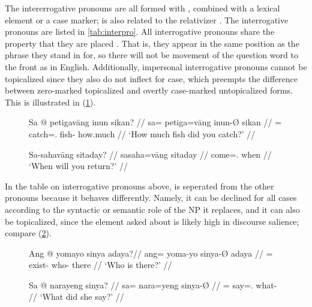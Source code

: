The intererrogative pronouns are all formed with , combined with
a lexical element or a case marker;  is also related to the
relativizer . The interrogative pronouns are listed in
\autoref{tab:interpro}. All interrogative pronouns share the property that they
are placed . That is, they appear in the same position as the
phrase they stand in for, so there will not be movement of the question word to
the front as in English. Additionally, impersonal interrogative pronouns cannot
be topicalized since they also do not inflect for case, which preempts the
difference between zero-marked topicalized and overtly case-marked
untopicalized forms. This is illustrated in (\ref{ex:qprondist}).

\begin{figure}[h]
\pex\label{ex:qprondist}
\a\begingl
	\gla Sa @ petigavāng inun sikan? //
	\glb sa= petiga=vāng inun-Ø sikan //
	\glc \PatT{}= catch=\Second{}.\Aarg{} fish-\Top{} how.much //
	\glft `How much fish did you catch?' //
\endgl

\a\begingl
	\gla Sa-sahavāng sitaday? //
	\glb sa\til{}saha=vāng sitaday //
	\glc \Iter{}\til{}come=\Second{}.\Aarg{} when //
	\glft `When will you return?' //
\endgl
\xe
\end{figure}

In the table on interrogative pronouns above,  is seperated from the other pronouns because it behaves differently.
Namely, it can be declined for all cases according to the syntactic or semantic
role of the NP it replaces, and it can also be topicalized, since the element
asked about is likely high in discourse salience; compare (\ref{ex:qprotop}).

\begin{figure}[h]
\pex\label{ex:qprotop}
\a\begingl
	\gla Ang @ yomayo sinya adaya?\footnotemark //
	\glb ang= yoma-yo sinya-Ø adaya //
	\glc \AgtT{}= exist-\TsgN{} who-\Top{} there //
	\glft `Who is there?' //
\endgl

\a\begingl
	\gla Sa @ narayeng sinya? //
	\glb sa= nara=yeng sinya-Ø //
	\glc \PatT{}= say=\TsgF{}.\Aarg{} what-\Top{} //
	\glft `What did she say?' //
\endgl
\xe
\end{figure}


